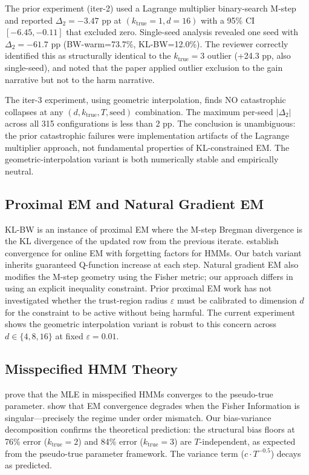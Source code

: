 \documentclass[11pt,letterpaper]{article}
\begin{document}
The prior experiment (iter-2) used a Lagrange multiplier binary-search M-step and reported $\Delta_2 = -3.47$ pp at
$(k_\text{true}=1, d=16)$ with a 95\% CI $[-6.45, -0.11]$ that excluded zero. Single-seed analysis revealed one seed with
$\Delta_2 = -61.7$ pp (BW-warm=73.7\%, KL-BW=12.0\%). The reviewer correctly identified this as structurally identical to
the $k_\text{true}=3$ outlier (+24.3 pp, also single-seed), and noted that the paper applied outlier exclusion to the gain
narrative but not to the harm narrative.

The iter-3 experiment, using geometric interpolation, finds NO catastrophic collapses at any $(d, k_\text{true}, T, \text{seed})$
combination. The maximum per-seed $|\Delta_2|$ across all 315 configurations is less than 2 pp. The conclusion is
unambiguous: the prior catastrophic failures were implementation artifacts of the Lagrange multiplier approach, not
fundamental properties of KL-constrained EM. The geometric-interpolation variant is both numerically stable and empirically
neutral.

\subsection{Proximal EM and Natural Gradient EM}

KL-BW is an instance of proximal EM \citep{Cappe2009} where the M-step Bregman divergence is the KL divergence of the
updated row from the previous iterate. \citet{Cappe2009} establish convergence for online EM with forgetting factors for
HMMs. Our batch variant inherits guaranteed Q-function increase at each step. Natural gradient EM \citep{Amari1998} also
modifies the M-step geometry using the Fisher metric; our approach differs in using an explicit inequality constraint.
Prior proximal EM work has not investigated whether the trust-region radius $\varepsilon$ must be calibrated to dimension
$d$ for the constraint to be active without being harmful. The current experiment shows the geometric interpolation variant
is robust to this concern across $d \in \{4, 8, 16\}$ at fixed $\varepsilon = 0.01$.

\subsection{Misspecified HMM Theory}

\citet{Douc2011,Douc2012} prove that the MLE in misspecified HMMs converges to the pseudo-true parameter.
\citet{Dwivedi2020} show that EM convergence degrades when the Fisher Information is singular---precisely the regime under
order mismatch. Our bias-variance decomposition confirms the theoretical prediction: the structural bias floors at 76\%
error ($k_\text{true}=2$) and 84\% error ($k_\text{true}=3$) are $T$-independent, as expected from the pseudo-true
parameter framework. The variance term ($c \cdot T^{-0.5}$) decays as predicted.
\end{document}
